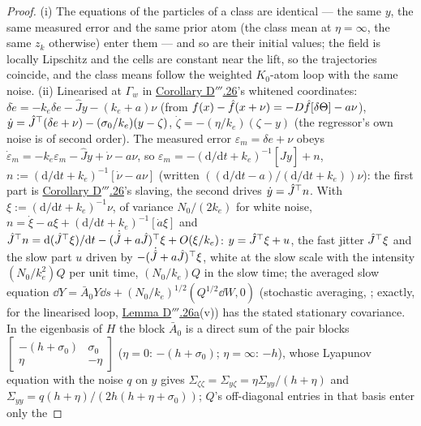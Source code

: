 \begin{proof}
(i) The equations of the particles of a class are identical --- the same $y$, the same measured error and the same
prior atom (the class mean at $\eta = \infty$, the same $z_k$ otherwise) enter them --- and so are their initial
values; the field is locally Lipschitz and the cells are constant near the lift, so the trajectories coincide, and the
class means follow the weighted $K_0$-atom loop with the same noise. (ii) Linearised at $\Gamma_w$ in
\hyperref[res:thmDppp:26]{Corollary D$'''$.26}'s whitened coordinates:
$\delta\dot e = -k_e\delta e - \hat Jy - (k_e + a)\nu$ (from $f(x) - \hat f(x + \nu) = -D\hat f[\delta\Theta] - a\nu$),
$\dot y = \hat J^\top(\delta e + \nu) - (\sigma_0/k_e)(y - \zeta)$, $\dot\zeta = -(\eta/k_e)(\zeta - y)$ (the
regressor's own noise is of second order). The measured error $\varepsilon_m = \delta e + \nu$ obeys
$\dot\varepsilon_m = -k_e\varepsilon_m - \hat Jy + \dot\nu - a\nu$, so
$\varepsilon_m = -(\mathrm{d}/\mathrm{d}t + k_e)^{-1}[\hat Jy] + n$,
$n := (\mathrm{d}/\mathrm{d}t + k_e)^{-1}[\dot\nu - a\nu]$ (written
$((\mathrm{d}/\mathrm{d}t - a)/(\mathrm{d}/\mathrm{d}t + k_e))\nu$): the first part is
\hyperref[res:thmDppp:26]{Corollary D$'''$.26}'s slaving, the second drives $\dot y = \hat J^\top n$. With
$\xi := (\mathrm{d}/\mathrm{d}t + k_e)^{-1}\nu$, of variance $N_0/(2k_e)$ for white noise,
$n = \dot\xi - a\xi + (\mathrm{d}/\mathrm{d}t + k_e)^{-1}[\dot a\xi]$ and
$\hat J^\top n = \mathrm{d}(\hat J^\top\xi)/\mathrm{d}t - (\dot{\hat J} + a\hat J)^\top\xi + O(\xi/k_e)$:
$y = \hat J^\top\xi + u$, the fast jitter $\hat J^\top\xi$ and the slow part $u$ driven by
$-(\dot{\hat J} + a\hat J)^\top\xi$, white at the slow scale with the intensity $(N_0/k_e^2)Q$ per unit time,
$(N_0/k_e)Q$ in the slow time; the averaged slow equation
$\dd Y = \bar A_0Y\dd s + (N_0/k_e)^{1/2}(Q^{1/2}\dd W,0)$ (stochastic averaging, \cite{S53}; exactly, for the
linearised loop, \hyperref[res:thmDppp:26a]{Lemma D$'''$.26a}(v)) has the stated stationary covariance. In the
eigenbasis of $H$ the block $\bar A_0$ is a direct sum of the pair blocks
$\left[\begin{smallmatrix}-(h + \sigma_0) & \sigma_0\\ \eta & -\eta\end{smallmatrix}\right]$ ($\eta = 0$:
$-(h + \sigma_0)$; $\eta = \infty$: $-h$), whose Lyapunov equation with the noise $q$ on $y$ gives
$\Sigma_{\zeta\zeta} = \Sigma_{y\zeta} = \eta\Sigma_{yy}/(h + \eta)$ and
$\Sigma_{yy} = q(h + \eta)/(2h(h + \eta + \sigma_0))$; $Q$'s off-diagonal entries in that basis enter only the

\end{proof}
